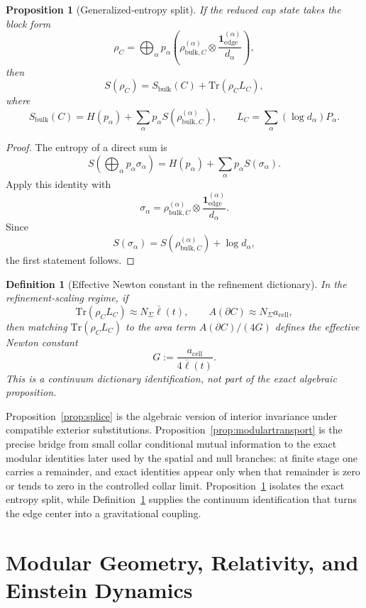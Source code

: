 \documentclass[11pt]{article}
\newtheorem{proposition}[theorem]{Proposition}
\newtheorem{definition}[theorem]{Definition}
\begin{document}
\begin{proposition}[Generalized-entropy split]\label{prop:gensplit}
If the reduced cap state takes the block form
\[
\rho_C=
\bigoplus_\alpha p_\alpha
\left(
\rho^{(\alpha)}_{\mathrm{bulk},C}\otimes
\frac{\mathbf 1^{(\alpha)}_{\mathrm{edge}}}{d_\alpha}
\right),
\]
then
\[
S(\rho_C)=S_{\mathrm{bulk}}(C)+\mathrm{Tr}(\rho_C L_C),
\]
where
\[
S_{\mathrm{bulk}}(C)=H(p_\alpha)+\sum_\alpha p_\alpha S(\rho^{(\alpha)}_{\mathrm{bulk},C}),
\qquad
L_C=\sum_\alpha (\log d_\alpha)P_\alpha.
\]
\end{proposition}

\begin{proof}
The entropy of a direct sum is
\[
S\!\left(\bigoplus_\alpha p_\alpha \sigma_\alpha\right)
=
H(p_\alpha)+\sum_\alpha p_\alpha S(\sigma_\alpha).
\]
Apply this identity with
\[
\sigma_\alpha=
\rho^{(\alpha)}_{\mathrm{bulk},C}\otimes
\frac{\mathbf 1^{(\alpha)}_{\mathrm{edge}}}{d_\alpha}.
\]
Since
\[
S(\sigma_\alpha)=S(\rho^{(\alpha)}_{\mathrm{bulk},C})+\log d_\alpha,
\]
the first statement follows.
\end{proof}

\begin{definition}[Effective Newton constant in the refinement dictionary]\label{def:newton}
In the refinement-scaling regime, if
\[
\mathrm{Tr}(\rho_C L_C)\approx N_\Sigma \bar\ell(t),
\qquad
A(\partial C)\approx N_\Sigma a_{\mathrm{cell}},
\]
then matching $\mathrm{Tr}(\rho_C L_C)$ to the area term $A(\partial C)/(4G)$ defines the effective Newton constant
\[
G:=\frac{a_{\mathrm{cell}}}{4\bar\ell(t)}.
\]
This is a continuum dictionary identification, not part of the exact algebraic proposition.
\end{definition}

Proposition~\ref{prop:splice} is the algebraic version of interior invariance under compatible exterior substitutions. Proposition~\ref{prop:modulartransport} is the precise bridge from small collar conditional mutual information to the exact modular identities later used by the spatial and null branches: at finite stage one carries a remainder, and exact identities appear only when that remainder is zero or tends to zero in the controlled collar limit. Proposition~\ref{prop:gensplit} isolates the exact entropy split, while Definition~\ref{def:newton} supplies the continuum identification that turns the edge center into a gravitational coupling.

\section{Modular Geometry, Relativity, and Einstein Dynamics}\label{sec:gravity}
\end{document}
